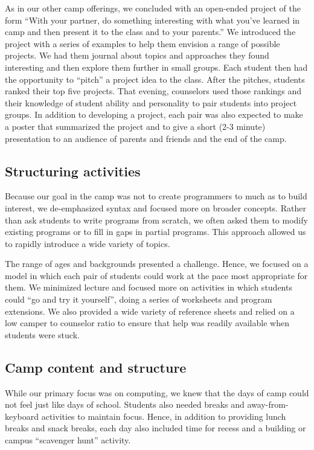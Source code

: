 As in our other camp offerings, we concluded with an open-ended
project of the form ``With your partner, do something interesting
with what you've learned in camp and then present it to the class
and to your parents.'' We introduced the project with a series of
examples to help them envision a range of possible projects.  We
had them journal about topics and approaches they found interesting
and then explore them further in small groups.  Each student then
had the opportunity to ``pitch'' a project idea to the class.  After
the pitches, students ranked their top five projects.  That evening,
counselors used those rankings and their knowledge of student ability
and personality to pair students into project groups.
In addition to developing a project, each pair was also expected to make
a poster that summarized the project and to give a short (2-3 minute)
presentation to an audience of parents and friends and the end of the
camp.

\subsection{Structuring activities}

Because our goal in the camp was not to create programmers to much as
to build interest, we de-emphasized syntax and focused more on broader
concepts.  Rather than ask students to write programs from scratch, we often
asked them to modify existing programs or to fill in gaps in partial
programs.  This approach allowed us to rapidly introduce a wide
variety of topics.

The range of ages and backgrounds presented a challenge.  Hence,
we focused on a model in which each pair of students could work at the
pace most appropriate for them.  We minimized lecture and focused more
on activities in which students could ``go and try it yourself'', doing
a series of worksheets and program extensions.  We also provided a wide
variety of reference sheets and relied on a low camper to counselor
ratio to ensure that help was readily available when students were stuck.

\subsection{Camp content and structure}

While our primary focus was on computing, we knew that the days of
camp could not feel just like days of school.  Students also needed
breaks and away-from-keyboard activities to maintain focus. Hence,
in addition to providing lunch breaks and snack breaks, each day
also included time for recess and a building or campus ``scavenger
hunt'' activity.

